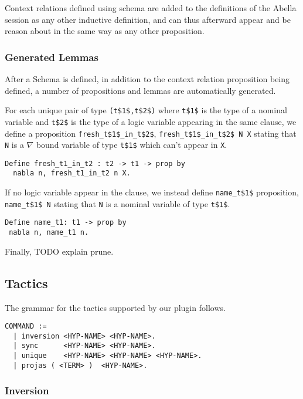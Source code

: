 \documentclass[nocopyrightspace,authoryear]{sigplanconf}
\begin{document}
Context relations defined using schema are added to the definitions of the Abella session as any other inductive definition, and can thus afterward appear and be reason about in the same way as any other proposition.

\subsubsection{Generated Lemmas}

After a Schema is defined, in addition to the context relation proposition being defined, a number of propositions and lemmas are automatically generated.

For each unique pair of type \lstinline|(t$1$,t$2$)| where \lstinline|t$1$| is the type of a nominal variable and \lstinline|t$2$| is the type of a logic variable appearing in the same clause, we define a proposition \lstinline|fresh_t$1$_in_t$2$|, \lstinline|fresh_t$1$_in_t$2$ N X| stating that \lstinline|N| is a $\nabla$ bound variable of type \lstinline|t$1$| which can't appear in \lstinline|X|.

\begin{lstlisting}
Define fresh_t1_in_t2 : t2 -> t1 -> prop by
  nabla n, fresh_t1_in_t2 n X.
\end{lstlisting}

If no logic variable appear in the clause, we instead define \lstinline|name_t$1$| proposition, \lstinline|name_t$1$ N| stating that \lstinline|N| is a nominal variable of type \lstinline|t$1$|.

\begin{lstlisting}
Define name_t1: t1 -> prop by
 nabla n, name_t1 n.
\end{lstlisting}

Finally, TODO explain prune.

\subsection{Tactics}
The grammar for the tactics supported by our plugin follows.
\begin{lstlisting}
COMMAND :=
  | inversion <HYP-NAME> <HYP-NAME>.
  | sync      <HYP-NAME> <HYP-NAME>.
  | unique    <HYP-NAME> <HYP-NAME> <HYP-NAME>.
  | projas ( <TERM> )  <HYP-NAME>.
\end{lstlisting}

\subsubsection{Inversion}
\label{subsec:inv}
\end{document}

